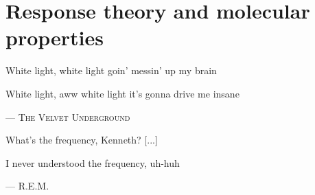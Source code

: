 \chapter{Response theory and molecular properties}\label{ch:molprop}

\epigraph{
White light, white light goin' messin' up my brain

White light, aww white light it's gonna drive me insane
}{
--- \textsc{The Velvet Underground}
}

\epigraph{What's the frequency, Kenneth? [...]

          I never understood the frequency, uh-huh}{
          --- \textsc{R.E.M.}}


